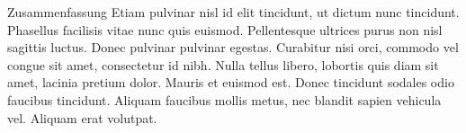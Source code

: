 \begin{coverpage}{Zusammenfassung}
Etiam pulvinar nisl id elit tincidunt, ut dictum nunc tincidunt. Phasellus facilisis vitae nunc quis euismod. Pellentesque ultrices purus non nisl sagittis luctus. Donec pulvinar pulvinar egestas. Curabitur nisi orci, commodo vel congue sit amet, consectetur id nibh. Nulla tellus libero, lobortis quis diam sit amet, lacinia pretium dolor. Mauris et euismod est. Donec tincidunt sodales odio faucibus tincidunt. Aliquam faucibus mollis metus, nec blandit sapien vehicula vel. Aliquam erat volutpat.
\end{coverpage}